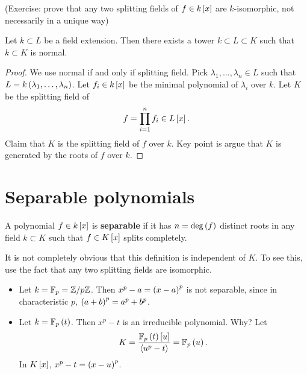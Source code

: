 (Exercise: prove that any two splitting fields of $ f \in k\sb{x} $ are $ k $-isomorphic, not necessarily in a unique way)


\begin{proposition}
Let $ k \subset L $ be a field extension. Then there exists a tower $ k \subset L \subset K $ such that $ k \subset K $ is normal.
\end{proposition}

\begin{proof}
We use normal if and only if splitting field. Pick $ \lambda_1, \dots, \lambda_n \in L $ such that $ L = k\rb{\lambda_1, \dots, \lambda_n} $. Let $ f_i \in k\sb{x} $ be the minimal polynomial of $ \lambda_i $ over $ k $. Let $ K $ be the splitting field of
$$ f = \prod_{i = 1}^n f_i \in L\sb{x}. $$
Claim that $ K $ is the splitting field of $ f $ over $ k $. Key point is argue that $ K $ is generated by the roots of $ f $ over $ k $.
\end{proof}

\pagebreak

\section{Separable polynomials}

\begin{definition}
A polynomial $ f \in k\sb{x} $ is \textbf{separable} if it has $ n = \deg\rb{f} $ distinct roots in any field $ k \subset K $ such that $ f \in K\sb{x} $ splits completely.
\end{definition}

\begin{remark*}
It is not completely obvious that this definition is independent of $ K $. To see this, use the fact that any two splitting fields are isomorphic.
\end{remark*}

\begin{example*}
\hfill
\begin{itemize}
\item Let $ k = \F_p = \Z / p\Z $. Then $ x^p - a = \rb{x - a}^p $ is not separable, since in characteristic $ p $, $ \rb{a + b}^p = a^p + b^p $.
\item Let $ k = \F_p\rb{t} $. Then $ x^p - t $ is an irreducible polynomial. Why? Let
$$ K = \dfrac{\F_p\rb{t}\sb{u}}{\ab{u^p - t}} = \F_p\rb{u}. $$
In $ K\sb{x} $, $ x^p - t = \rb{x - u}^p $.
\end{itemize}
\end{example*}

